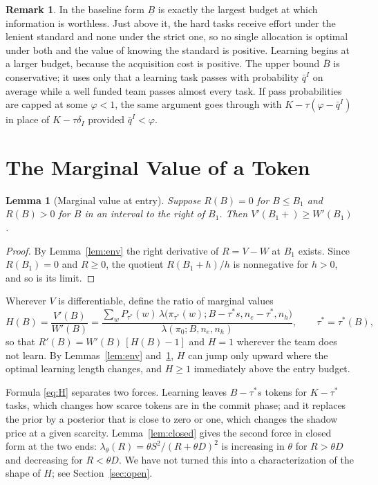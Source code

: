 \documentclass[11pt]{article}
\newtheorem{lemma}{Lemma}
\theoremstyle{definition}
\newtheorem{remark}{Remark}
\begin{document}
\begin{remark}
In the baseline form $\underline B$ is exactly the largest budget at which information is worthless. Just above it, the hard tasks receive effort under the lenient standard and none under the strict one, so no single allocation is optimal under both and the value of knowing the standard is positive. Learning begins at a larger budget, because the acquisition cost is positive. The upper bound $\overline B$ is conservative; it uses only that a learning task passes with probability $\bar q^I$ on average while a well funded team passes almost every task. If pass probabilities are capped at some $\varphi<1$, the same argument goes through with $K-\tau(\varphi-\bar q^I)$ in place of $K-\tau\delta_I$ provided $\bar q^I<\varphi$.
\end{remark}

\section{The Marginal Value of a Token}

\begin{lemma}[Marginal value at entry]\label{lem:entry}
Suppose $R(B)=0$ for $B\le B_1$ and $R(B)>0$ for $B$ in an interval to the right of $B_1$. Then $V'(B_1+)\ge W'(B_1)$.
\end{lemma}

\begin{proof}
By Lemma~\ref{lem:env} the right derivative of $R=V-W$ at $B_1$ exists. Since $R(B_1)=0$ and $R\ge0$, the quotient $R(B_1+h)/h$ is nonnegative for $h>0$, and so is its limit.
\end{proof}

Wherever $V$ is differentiable, define the ratio of marginal values
\begin{equation}\label{eq:H}
H(B)=\frac{V'(B)}{W'(B)}
=\frac{\sum_wP_{\tau^*}(w)\,\lambda\bigl(\pi_{\tau^*}(w);B-\tau^*s,n_e-\tau^*,n_h\bigr)}{\lambda(\pi_0;B,n_e,n_h)},\qquad \tau^*=\tau^*(B),
\end{equation}
so that $R'(B)=W'(B)\,[H(B)-1]$ and $H=1$ wherever the team does not learn. By Lemmas~\ref{lem:env} and~\ref{lem:entry}, $H$ can jump only upward where the optimal learning length changes, and $H\ge1$ immediately above the entry budget.

Formula \eqref{eq:H} separates two forces. Learning leaves $B-\tau^*s$ tokens for $K-\tau^*$ tasks, which changes how scarce tokens are in the commit phase; and it replaces the prior by a posterior that is close to zero or one, which changes the shadow price at a given scarcity. Lemma~\ref{lem:closed} gives the second force in closed form at the two ends: $\lambda_\theta(R)=\theta S^2/(R+\theta D)^2$ is increasing in $\theta$ for $R>\theta D$ and decreasing for $R<\theta D$. We have not turned this into a characterization of the shape of $H$; see Section~\ref{sec:open}.
\end{document}
